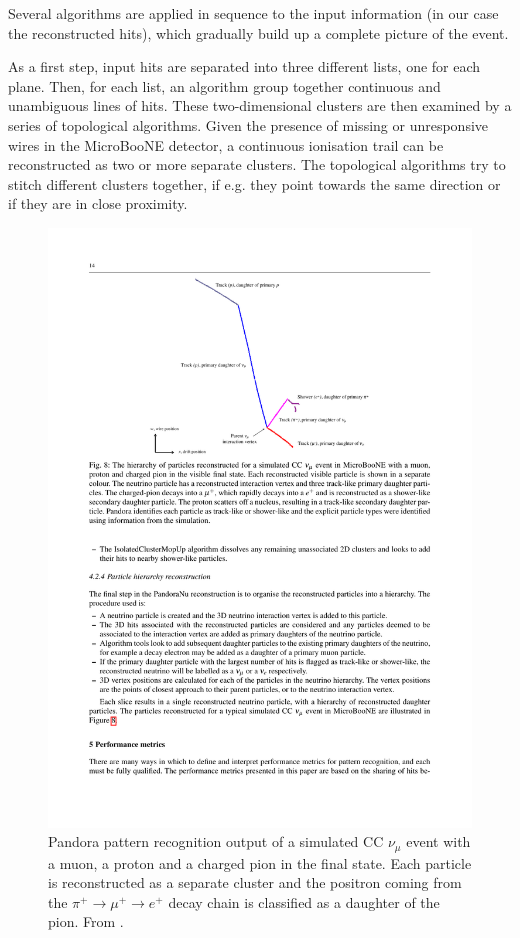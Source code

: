 Several algorithms are applied in sequence to the input information (in our case the reconstructed hits), which gradually build up a complete picture of the event.

As a first step, input hits are separated into three different lists, one for each plane. Then, for each list, an algorithm group together continuous and unambiguous lines of hits. These two-dimensional clusters are then examined by a series of topological algorithms. Given the presence of missing or unresponsive wires in the MicroBooNE detector, a continuous ionisation trail can be reconstructed as two or more separate clusters. The topological algorithms try to stitch different clusters together, if e.g. they point towards the same direction or if they are in close proximity. 

\begin{figure}[htbp]
    \centering
    \includegraphics[width=0.75\linewidth]{figures/pandora_evd.pdf}
    \caption{Pandora pattern recognition output of a simulated CC $\nu_{\mu}$ event with a muon, a proton and a charged pion in the final state. Each particle is reconstructed as a separate cluster and the positron coming from the $\pi^+\rightarrow\mu^+\rightarrow e^+$ decay chain is classified as a daughter of the pion. From \cite{Acciarri:2017hat}.}\label{fig:evd_pandora}
\end{figure}

